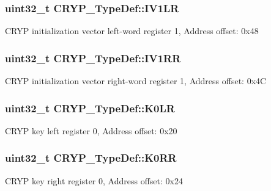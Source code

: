 \subsubsection[{\texorpdfstring{I\+V1\+LR}{IV1LR}}]{ uint32\+\_\+t C\+R\+Y\+P\+\_\+\+Type\+Def\+::\+I\+V1\+LR}\hypertarget{struct_c_r_y_p___type_def_a8d837d2677d8ca1d8ed8bc018d6bb176}{}\label{struct_c_r_y_p___type_def_a8d837d2677d8ca1d8ed8bc018d6bb176}
C\+R\+YP initialization vector left-\/word register 1, Address offset\+: 0x48 
\subsubsection[{\texorpdfstring{I\+V1\+RR}{IV1RR}}]{ uint32\+\_\+t C\+R\+Y\+P\+\_\+\+Type\+Def\+::\+I\+V1\+RR}\hypertarget{struct_c_r_y_p___type_def_aca99392151eb711971f5260ca675c81b}{}\label{struct_c_r_y_p___type_def_aca99392151eb711971f5260ca675c81b}
C\+R\+YP initialization vector right-\/word register 1, Address offset\+: 0x4C 
\subsubsection[{\texorpdfstring{K0\+LR}{K0LR}}]{ uint32\+\_\+t C\+R\+Y\+P\+\_\+\+Type\+Def\+::\+K0\+LR}\hypertarget{struct_c_r_y_p___type_def_a9dc2c37bda5dd59196c295be21c1f88b}{}\label{struct_c_r_y_p___type_def_a9dc2c37bda5dd59196c295be21c1f88b}
C\+R\+YP key left register 0, Address offset\+: 0x20 
\subsubsection[{\texorpdfstring{K0\+RR}{K0RR}}]{ uint32\+\_\+t C\+R\+Y\+P\+\_\+\+Type\+Def\+::\+K0\+RR}\hypertarget{struct_c_r_y_p___type_def_a2a1fdc979620667cc9c40c5caa5cd6ba}{}\label{struct_c_r_y_p___type_def_a2a1fdc979620667cc9c40c5caa5cd6ba}
C\+R\+YP key right register 0, Address offset\+: 0x24 
